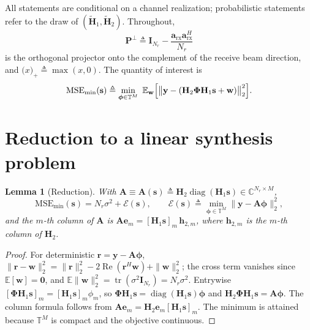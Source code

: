 \documentclass[11pt]{article}
\newtheorem{lemma}{Lemma}
\theoremstyle{remark}
\begin{document}
All statements are conditional on a channel realization; probabilistic
statements refer to the draw of $(\tilde{\mathbf{H}}_1,\tilde{\mathbf{H}}_2)$.
Throughout,
\begin{equation}
\mathbf{P}^{\perp} \triangleq
\mathbf{I}_{N_r}-\frac{\mathbf{a}_{\mathrm{rx}}\mathbf{a}_{\mathrm{rx}}^{H}}{N_r}
\label{eq:Pperp}
\end{equation}
is the orthogonal projector onto the complement of the receive beam direction,
and $\bigl(x\bigr)_{+}\triangleq\max(x,0)$. The quantity of interest is
\begin{equation}
\mathrm{MSE}_{\min}(\mathbf{s})
\triangleq
\min_{\boldsymbol{\phi}\in\mathbb{T}^{M}}\
\mathbb{E}_{\mathbf{w}}
\Bigl[\bigl\|\mathbf{y}-(\mathbf{H}_2\boldsymbol{\Phi}\mathbf{H}_1\mathbf{s}
       +\mathbf{w})\bigr\|_2^2\Bigr].
\label{eq:objective}
\end{equation}

\section{Reduction to a linear synthesis problem}

\begin{lemma}[Reduction]
\label{lem:reduction}
With
$\mathbf{A}\equiv\mathbf{A}(\mathbf{s})
 \triangleq\mathbf{H}_2\operatorname{diag}(\mathbf{H}_1\mathbf{s})
 \in\mathbb{C}^{N_r\times M}$,
\begin{equation}
\mathrm{MSE}_{\min}(\mathbf{s})=N_r\sigma^2+\mathcal{E}(\mathbf{s}),
\qquad
\mathcal{E}(\mathbf{s})\triangleq
\min_{\boldsymbol{\phi}\in\mathbb{T}^{M}}\|\mathbf{y}-\mathbf{A}\boldsymbol{\phi}\|_2^2,
\label{eq:reduction}
\end{equation}
and the $m$-th column of $\mathbf{A}$ is
$\mathbf{A}\mathbf{e}_m=[\mathbf{H}_1\mathbf{s}]_m\,\mathbf{h}_{2,m}$, where
$\mathbf{h}_{2,m}$ is the $m$-th column of $\mathbf{H}_2$.
\end{lemma}

\begin{proof}
For deterministic $\mathbf{r}=\mathbf{y}-\mathbf{A}\boldsymbol{\phi}$,
$\|\mathbf{r}-\mathbf{w}\|_2^2
 =\|\mathbf{r}\|_2^2-2\operatorname{Re}(\mathbf{r}^{H}\mathbf{w})
  +\|\mathbf{w}\|_2^2$;
the cross term vanishes since $\mathbb{E}[\mathbf{w}]=\mathbf{0}$, and
$\mathbb{E}\|\mathbf{w}\|_2^2=\operatorname{tr}(\sigma^2\mathbf{I}_{N_r})
 =N_r\sigma^2$.
Entrywise
$[\boldsymbol{\Phi}\mathbf{H}_1\mathbf{s}]_m=[\mathbf{H}_1\mathbf{s}]_m\phi_m$,
so $\boldsymbol{\Phi}\mathbf{H}_1\mathbf{s}
 =\operatorname{diag}(\mathbf{H}_1\mathbf{s})\boldsymbol{\phi}$ and
$\mathbf{H}_2\boldsymbol{\Phi}\mathbf{H}_1\mathbf{s}
 =\mathbf{A}\boldsymbol{\phi}$. The column formula follows from
$\mathbf{A}\mathbf{e}_m=\mathbf{H}_2\mathbf{e}_m[\mathbf{H}_1\mathbf{s}]_m$. The
minimum is attained because $\mathbb{T}^{M}$ is compact and the objective
continuous.
\end{proof}
\end{document}
